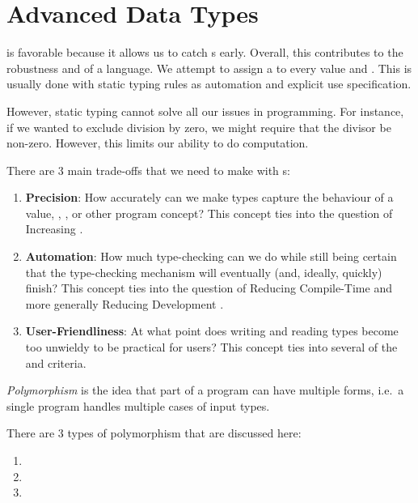 \section{Advanced Data Types}\label{sec:Advanced_Data_Types}
 is favorable because it allows us to catch s early.
Overall, this contributes to the robustness and  of a language.
We attempt to assign a  to every value and .
This is usually done with static typing rules as automation and explicit use specification.

However, static typing cannot solve all our issues in programming.
For instance, if we wanted to exclude division by zero, we might require that the divisor be non-zero.
However, this limits our ability to do computation.

There are 3 main trade-offs that we need to make with s:
\begin{enumerate}[noitemsep]
\item \textbf{Precision}: How accurately can we make types capture the behaviour of a value, , , or other program concept?
  This concept ties into the question of Increasing .
\item \textbf{Automation}: How much type-checking can we do while still being certain that the type-checking mechanism will eventually (and, ideally, quickly) finish?
  This concept ties into the question of Reducing Compile-Time  and more generally Reducing Development .
\item \textbf{User-Friendliness}: At what point does writing and reading types become too unwieldy to be practical for users?
  This concept ties into several of the  and  criteria.
\end{enumerate}

\begin{definition}[Polymorphism]\label{def:Polymorphism}
  \emph{Polymorphism} is the idea that part of a program can have multiple forms, i.e.\ a single program handles multiple cases of input types.

  There are 3 types of polymorphism that are discussed here:
  \begin{enumerate}[noitemsep]
  \item {}
  \item {}
  \item {}
  \end{enumerate}
\end{definition}

